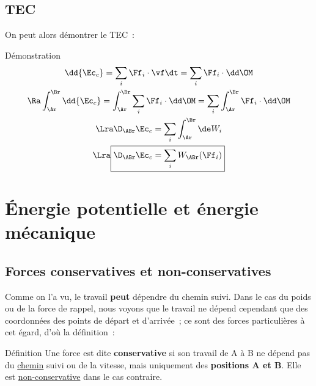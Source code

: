 \documentclass[../main/main.tex]{subfiles}
\begin{document}
\subsection{TEC}
On peut alors démontrer le TEC~:

\begin{rdemo}{Démonstration}
    \begin{gather*}
        \dd{\Ec_c} = \sum_i\Ff_i\cdot\vf\dt = \sum_i \Ff_i\cdot\dd\OM
        \\\Ra
        \int_{\Ar}^{\Br} \dd{\Ec_c} = \int_{\Ar}^{\Br} \sum_i \Ff_i\cdot\dd\OM
            = \sum_i \int_{\Ar}^{\Br} \Ff_i\cdot\dd\OM
        \\\Lra
        \D_{\ABr}\Ec_c = \sum_i \int_{\Ar}^{\Br} \de W_i
        \\\Lra
        \boxed{\D_{\ABr}\Ec_c = \sum_i W_{\ABr}(\Ff_i)}
    \end{gather*}
\end{rdemo}

\section{Énergie potentielle et énergie mécanique}
\subsection{Forces conservatives et non-conservatives}
Comme on l'a vu, le travail \textbf{peut} dépendre du chemin suivi. Dans le cas
du poids ou de la force de rappel, nous voyons que le travail ne dépend
cependant que des coordonnées des points de départ et d'arrivée~; ce sont des
forces particulières à cet égard, d'où la définition~:

\begin{tdefi}{Définition}
    Une force est dite \textbf{conservative} si son travail de A à B ne dépend pas du
    \underline{chemin} suivi ou de la vitesse, mais uniquement des
    \textbf{positions A et B}. Elle est \underline{non-conservative} dans le cas
    contraire.
\end{tdefi}
\end{document}
